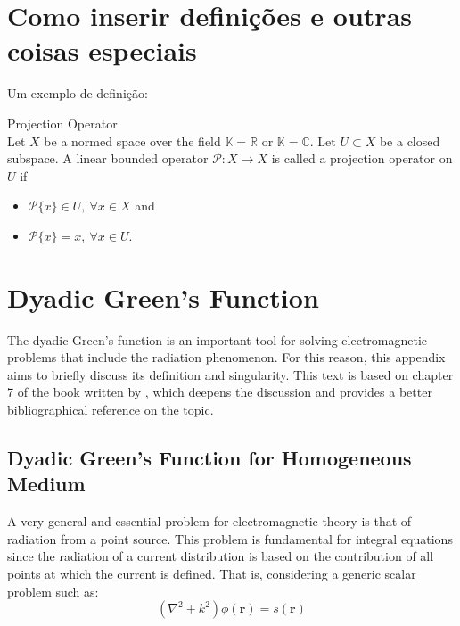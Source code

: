 	\chapter{Como inserir definições e outras coisas especiais}

		Um exemplo de definição:
		\begin{definition}\label{def:3:projection}
			Projection Operator\\
			Let $X$ be a normed space over the field $\mathbb{K}=\mathbb{R}$ or $\mathbb{K}=\mathbb{C}$. Let $U\subset X$ be a closed subspace. A linear bounded operator $\mathcal{P} : X\rightarrow X$ is called a projection operator on $U$ if
			\begin{itemize}
				\item $\mathcal{P}\{x\} \in U, ~\forall x\in X$ and
				\item $\mathcal{P}\{x\} = x,~ \forall x\in U$.
			\end{itemize}
		\end{definition}

	\chapter{Dyadic Green's Function}\label{app:green}
	
		The dyadic Green's function is an important tool for solving electromagnetic problems that include the radiation phenomenon. For this reason, this appendix aims to briefly discuss its definition and singularity. This text is based on chapter 7 of the book written by \cite{chew1995}, which deepens the discussion and provides a better bibliographical reference on the topic.

		\section{Dyadic Green's Function for Homogeneous Medium}\label{app:green:1}

			A very general and essential problem for electromagnetic theory is that of radiation from a point source. This problem is fundamental for integral equations since the radiation of a current distribution is based on the contribution of all points at which the current is defined. That is, considering a generic scalar problem such as:
			\begin{equation}
				(\nabla^2+k^2)\phi(\mathbf{r}) = s(\mathbf{r}) \label{eq:app:green:1}
			\end{equation}

